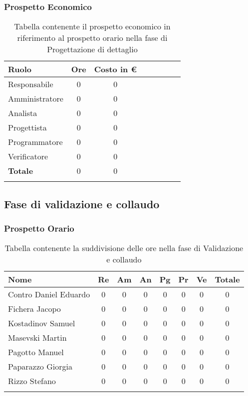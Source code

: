 \documentclass[../piano_di_progetto.tex]{subfiles}
\begin{document}
\subsubsection{Prospetto Economico}

\begin{center}
	\begin{longtable}{|l|c|c|c|c|c|c|c|}
		\hline
		\rowcolor{lightgray}
		\textbf{Ruolo} & \textbf{Ore} & \textbf{Costo in €}\\

		\hline
		Responsabile & 0 & 0\\
		\hline
		Amministratore & 0 & 0\\
		\hline
		Analista & 0 & 0\\
		\hline
		Progettista & 0 & 0\\
		\hline
		Programmatore & 0 & 0\\
		\hline
		Verificatore & 0 & 0\\
		\hline
		\textbf{Totale} & 0 & 0\\
		\hline
		\caption{Tabella contenente il prospetto economico in riferimento al prospetto orario nella fase di Progettazione di dettaglio}
	\end{longtable}
\end{center}

\subsection{ Fase di validazione e collaudo}%
\label{sub:fase_valid_collaudo}
\subsubsection{Prospetto Orario}

\begin{center}
	\begin{longtable}{|l|c|c|c|c|c|c|c|}
		\hline
		\rowcolor{lightgray}
		\textbf{Nome} & \textbf{Re} & \textbf{Am} & \textbf{An} & \textbf{Pg}  & \textbf{Pr}   & \textbf{Ve} & \textbf{Totale} \\

		\hline
			Contro Daniel Eduardo & 0 &0&0&0&0&0 & 0 \\
		\hline
			Fichera Jacopo &  0 &0&0&0&0&0 & 0 \\
		\hline
			Kostadinov Samuel &  0 &0&0&0&0&0 & 0 \\			
		\hline
			Masevski Martin 	&  0 &0&0&0&0&0 & 0\\
		\hline
			Pagotto Manuel &  0 &0&0&0&0&0 & 0 \\			
		\hline
			Paparazzo Giorgia &  0 &0&0&0&0&0 & 0 \\
		\hline
			Rizzo Stefano &  0 &0&0&0&0&0 & 0\\
		\hline	

		\caption{Tabella contenente la suddivisione delle ore nella fase di Validazione e collaudo}
	\end{longtable}
\end{center}
\end{document}
